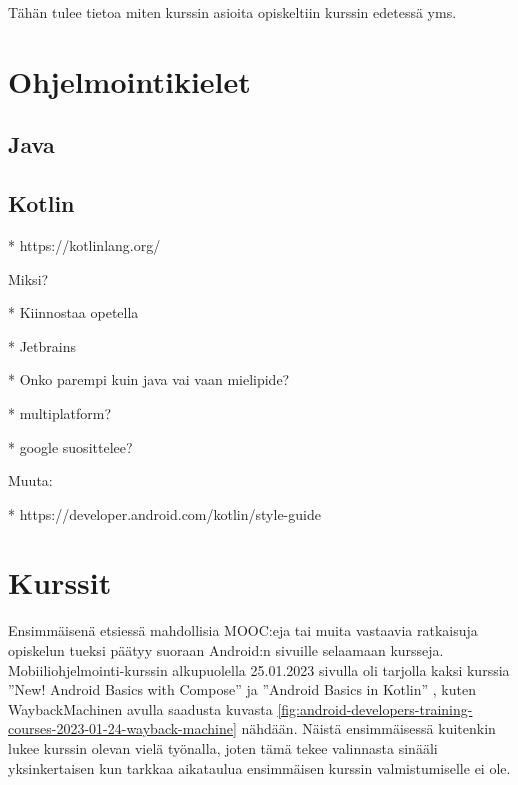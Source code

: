 
Tähän tulee tietoa miten kurssin asioita opiskeltiin kurssin edetessä yms.

\section{Ohjelmointikielet}

\subsection{Java}

\subsection{Kotlin}

* https://kotlinlang.org/

Miksi?

* Kiinnostaa opetella

* Jetbrains

* Onko parempi kuin java vai vaan mielipide?

* multiplatform?

* google suosittelee?

Muuta:

* https://developer.android.com/kotlin/style-guide


\section{Kurssit}

Ensimmäisenä etsiessä mahdollisia MOOC:eja tai muita vastaavia ratkaisuja
opiskelun tueksi päätyy suoraan Android:n sivuille
\parencite{AndroidDevelopersTrainingCourses} selaamaan kursseja.
Mobiiliohjelmointi-kurssin alkupuolella 25.01.2023 sivulla oli tarjolla kaksi
kurssia ''New! Android Basics with Compose''
\parencite{AndroidDevelopersAndroidBasicsInKotlin} ja ''Android Basics in
Kotlin'' \parencite{AndroidDevelopersAndroidBasicsWithCompose}, kuten
WaybackMachinen
\parencite{AndroidDevelopersTrainingCoursesWaybackMachine202301} avulla
saadusta kuvasta
\ref{fig:android-developers-training-courses-2023-01-24-wayback-machine}
nähdään. Näistä ensimmäisessä kuitenkin lukee kurssin olevan vielä työnalla,
joten tämä tekee valinnasta sinääli yksinkertaisen kun tarkkaa aikataulua
ensimmäisen kurssin valmistumiselle ei ole.

